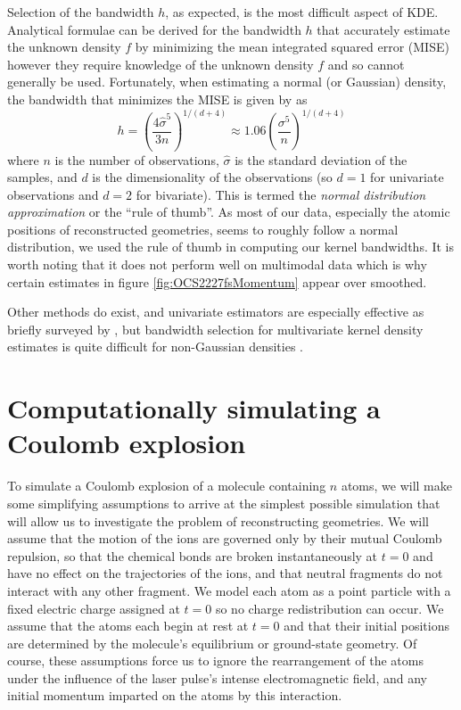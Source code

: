Selection of the bandwidth $h$, as expected, is the most difficult aspect of KDE. Analytical formulae can be derived for the bandwidth $h$ \citep[p. 143]{Scott15} that accurately estimate the unknown density $f$ by minimizing the mean integrated squared error (MISE) however they require knowledge of the unknown density $f$ and so cannot generally be used. Fortunately, when estimating a normal (or Gaussian) density, the bandwidth that minimizes the MISE is given by \citet{Silverman86} as
\begin{equation}
h = \left(\frac{4\hat{\sigma}^5}{3n} \right)^{1/(d+4)}
\approx 1.06 \left(\frac{\sigma^5}{n} \right)^{1/(d+4)}
\end{equation}
where $n$ is the number of observations, $\hat{\sigma}$ is the standard deviation of the samples, and $d$ is the dimensionality of the observations (so $d=1$ for univariate observations and $d=2$ for bivariate). This is termed the \emph{normal distribution approximation} or the ``rule of thumb''. As most of our data, especially the atomic positions of reconstructed geometries, seems to roughly follow a normal distribution, we used the \citet{Silverman86} rule of thumb in computing our kernel bandwidths. It is worth noting that it does not perform well on multimodal data which is why certain estimates in figure \ref{fig:OCS2227fsMomentum} appear over smoothed.

Other methods do exist, and univariate estimators are especially effective as briefly surveyed by \citet{Jones96}, but bandwidth selection for multivariate kernel density estimates is quite difficult for non-Gaussian densities \citep[\S 6.5.2]{Scott15}.

\section{Computationally simulating a Coulomb explosion} \label{sec:simulating}
To simulate a Coulomb explosion of a molecule containing $n$ atoms, we will make some simplifying assumptions to arrive at the simplest possible simulation that will allow us to investigate the problem of reconstructing geometries. We will assume that the motion of the ions are governed only by their mutual Coulomb repulsion, so that the chemical bonds are broken instantaneously at $t = 0$ and have no effect on the trajectories of the ions, and that neutral fragments do not interact with any other fragment. We model each atom as a point particle with a fixed electric charge assigned at $t = 0$ so no charge redistribution can occur. We assume that the atoms each begin at rest at $t = 0$ and that their initial positions are determined by the molecule's equilibrium or ground-state geometry. Of course, these assumptions force us to ignore the rearrangement of the atoms under the influence of the laser pulse's intense electromagnetic field, and any initial momentum imparted on the atoms by this interaction.

